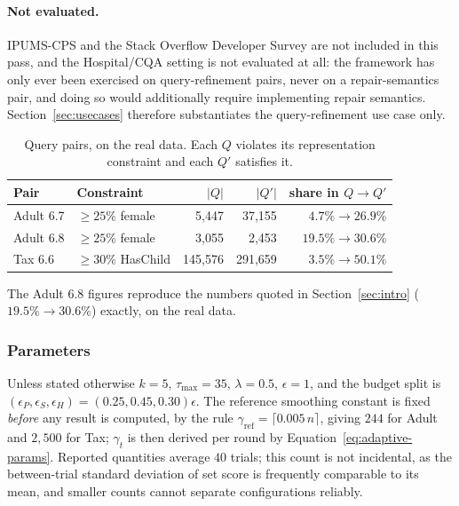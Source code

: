 \paragraph{Not evaluated.}
IPUMS-CPS and the Stack Overflow Developer Survey are not included in this pass, and the Hospital/CQA setting is not evaluated at all: the framework has only ever been exercised on query-refinement pairs, never on a repair-semantics pair, and doing so would additionally require implementing repair semantics.
Section~\ref{sec:usecases} therefore substantiates the query-refinement use case only.

\begin{table}[t]
\centering
\small
\caption{Query pairs, on the real data. Each $Q$ violates its representation constraint and each $Q'$ satisfies it.}
\label{tab:query-pairs}
\begin{tabular}{@{}llrrr@{}}
\toprule
Pair & Constraint & $|Q|$ & $|Q'|$ & share in $Q\rightarrow Q'$ \\
\midrule
Adult 6.7  & $\ge25\%$ female   & 5{,}447  & 37{,}155  & $4.7\%\rightarrow26.9\%$ \\
Adult 6.8  & $\ge25\%$ female   & 3{,}055  & 2{,}453   & $19.5\%\rightarrow30.6\%$ \\
Tax 6.6    & $\ge30\%$ HasChild & 145{,}576 & 291{,}659 & $3.5\%\rightarrow50.1\%$ \\
\bottomrule
\end{tabular}
\end{table}

The Adult 6.8 figures reproduce the numbers quoted in Section~\ref{sec:intro} ($19.5\%\rightarrow30.6\%$) exactly, on the real data.

\subsubsection{Parameters}
\label{subsubsec:parameters}

Unless stated otherwise $k=5$, $\tau_{\max}=35$, $\lambda=0.5$, $\epsilon=1$, and the budget split is $(\epsilon_P,\epsilon_S,\epsilon_H)=(0.25,0.45,0.30)\epsilon$.
The reference smoothing constant is fixed \emph{before} any result is computed, by the rule $\gamma_{\text{ref}}=\lceil 0.005\,n\rceil$, giving $244$ for Adult and $2{,}500$ for Tax; $\gamma_t$ is then derived per round by Equation~\eqref{eq:adaptive-params}.
Reported quantities average $40$ trials; this count is not incidental, as the between-trial standard deviation of set score is frequently comparable to its mean, and smaller counts cannot separate configurations reliably.

